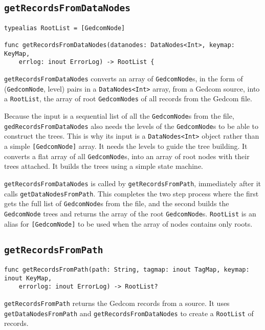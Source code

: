 \subsection{\texttt{getRecordsFromDataNodes}}
\begin{verbatim}
typealias RootList = [GedcomNode]

func getRecordsFromDataNodes(datanodes: DataNodes<Int>, keymap: KeyMap,
    errlog: inout ErrorLog) -> RootList {
\end{verbatim}

\texttt{getRecordsFromDataNodes} converts an array of
\texttt{GedcomNode}s, in the form of (\texttt{GedcomNode}, level)
pairs in a \texttt{DataNodes<Int>} array, from a Gedcom source,
into a \texttt{RootList}, the array of root
\texttt{GedcomNodes} of all records from the Gedcom file.

Because the input is a sequential list of all the \texttt{GedcomNode}s
from the file, \texttt{gedRecordsFromDataNodes} also needs the levels
of the \texttt{GedcomNode}s to be able to construct the trees.
This is why its input is a \texttt{DataNodes<Int>} object rather
than a simple \texttt{[GedcomNode]} array. It needs the levels to
guide the tree building.
It converts a flat array of all \texttt{GedcomNode}s, into an array
of root nodes with their trees attached.
It builds the trees using a simple state machine.

\texttt{getRecordsFromDataNodes} is called by
\texttt{getRecordsFromPath},
immediately after it calls \texttt{get\-Data\-Nodes\-From\-Path}.
This completes the two step process where the first gets the
full list of
\texttt{GedcomNode}s
from the file, and the second builds the \texttt{GedcomNode} trees
and returns the array of the root \texttt{GedcomNode}s.
\texttt{RootList} is an alias for \texttt{[GedcomNode]}
to be used when the array of nodes contains only roots.

%
%

\subsection{\texttt{getRecordsFromPath}}

\begin{verbatim}
func getRecordsFromPath(path: String, tagmap: inout TagMap, keymap: inout KeyMap,
    errorlog: inout ErrorLog) -> RootList?
\end{verbatim}
\texttt{getRecordsFromPath} returns the Gedcom records from a source. It uses
\texttt{getDataNodesFromPath} and \texttt{getRecordsFromDataNodes} to
create a \texttt{RootList} of records.

